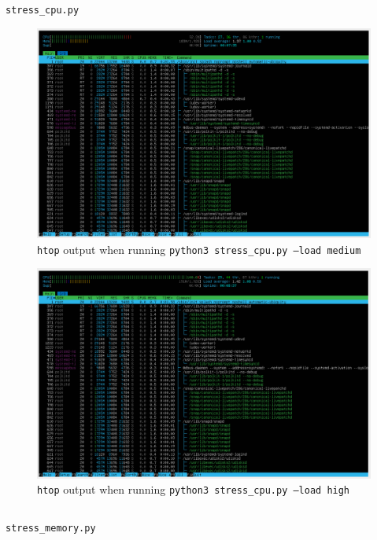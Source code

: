 \documentclass[a4paper]{article}
\newenvironment{code}{\captionsetup{type=listing}}{}
\begin{document}
\begin{code}
\inputminted[linenos, breaklines, frame=single]{python}{../code/stressers/stress_cpu.py}
\caption{\texttt{stress\_cpu.py}}
\end{code}

\begin{figure}[H]
    \centering
    \includegraphics[width=\textwidth]{./images/medcpuload.png}
    \caption{\texttt{htop} output when running \texttt{python3 stress_cpu.py --load medium}}
\end{figure}

\begin{figure}[H]
    \centering
    \includegraphics[width=\textwidth]{./images/highcpuload.png}
    \caption{\texttt{htop} output when running \texttt{python3 stress_cpu.py --load high}}
\end{figure}

\begin{code}
\inputminted[linenos, breaklines, frame=single]{python}{../code/stressers/stress_memory.py}
\caption{\texttt{stress\_memory.py}}
\end{code}
\end{document}
